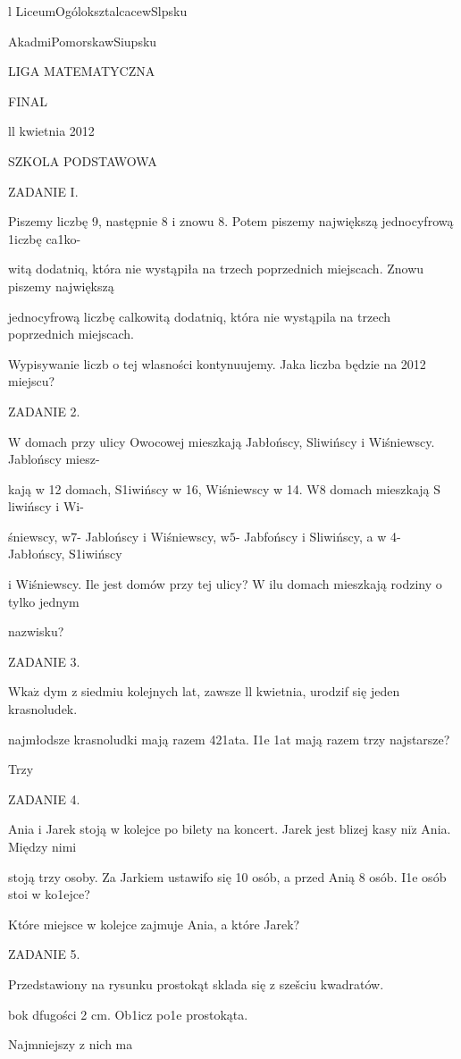 \documentclass[a4paper,12pt]{article}
\begin{document}
l LiceumOgóloksztalcacewSlpsku

AkadmiPomorskawSiupsku

LIGA MATEMATYCZNA

FINAL

ll kwietnia 2012

SZKOLA PODSTAWOWA

ZADANIE I.

Piszemy liczbę 9, następnie 8 i znowu 8. Potem piszemy największą jednocyfrową 1iczbę ca1ko-

witą dodatniq, która nie wystąpiła na trzech poprzednich miejscach. Znowu piszemy największą

jednocyfrową liczbę calkowitą dodatniq, która nie wystąpila na trzech poprzednich miejscach.

Wypisywanie liczb o tej wlasności kontynuujemy. Jaka liczba będzie na 2012 miejscu?

ZADANIE 2.

$\mathrm{W}$ domach przy ulicy Owocowej mieszkają Jabłońscy, S$\acute{}$liwińscy i Wiśniewscy. Jablońscy miesz-

kają w 12 domach, S$\acute{}$1iwińscy w 16, Wiśniewscy w 14. $\mathrm{W}8$ domach mieszkają S$\acute{}$liwińscy i Wi-

śniewscy, $\mathrm{w}7$- Jablońscy i Wiśniewscy, $\mathrm{w}5$- Jabfońscy i S$\acute{}$liwińscy, a w 4- Jabłońscy, S$\acute{}$1iwińscy

i Wiśniewscy. Ile jest domów przy tej ulicy? $\mathrm{W}$ ilu domach mieszkają rodziny o tylko jednym

nazwisku?

ZADANIE 3.

$\mathrm{W}\mathrm{k}\mathrm{a}\dot{\mathrm{z}}$ dym z siedmiu kolejnych lat, zawsze ll kwietnia, urodzif się jeden krasnoludek.

najmłodsze krasnoludki mają razem 421ata. I1e 1at mają razem trzy najstarsze?

Trzy

ZADANIE 4.

Ania i Jarek stoją w kolejce po bilety na koncert. Jarek jest blizej kasy $\mathrm{n}\mathrm{i}\dot{\mathrm{z}}$ Ania. Między nimi

stoją trzy osoby. Za Jarkiem ustawifo się 10 osób, a przed Anią 8 osób. I1e osób stoi w ko1ejce?

Które miejsce w kolejce zajmuje Ania, a które Jarek?

ZADANIE 5.

Przedstawiony na rysunku prostokąt sklada się z szešciu kwadratów.

bok dfugości 2 cm. Ob1icz po1e prostokąta.

Najmniejszy z nich ma
\end{document}
